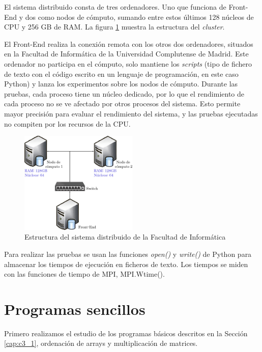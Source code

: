 El sistema distribuido consta de tres ordenadores. Uno que funciona de Front-End y dos como nodos de cómputo, sumando entre estos últimos 128 núcleos de CPU y 256 GB de RAM. La figura \ref{fig:cluster} muestra la estructura del \textit{cluster}.




El Front-End realiza la conexión remota con los otros dos ordenadores, situados en la Facultad de Informática de la Universidad Complutense de Madrid. Este ordenador no participa en el cómputo, solo mantiene los \textit{scripts} (tipo de fichero de texto con el código escrito en un lenguaje de programación, en este caso Python) y lanza los experimentos sobre los nodos de cómputo.  Durante las pruebas, cada proceso tiene un núcleo dedicado, por lo que el rendimiento de cada proceso no se ve afectado por otros procesos del sistema. Esto permite mayor precisión para evaluar el rendimiento del sistema, y las pruebas ejecutadas no compiten por los recursos de la CPU. 


\vspace*{0.2cm}

\begin{figure}[!h]
	\centering
	\includegraphics[width=0.5\textwidth]{images/chapter_4/cluster}
	\caption{Estructura del sistema distribuido de la Facultad de Informática}
	\label{fig:cluster}
\end{figure}


Para realizar las pruebas se usan las funciones \textit{open()} y \textit{write()} de Python para almacenar los tiempos de ejecución en ficheros de texto. Los tiempos se miden con las funciones de
tiempo de MPI, MPI.Wtime().

\section{Programas sencillos}

Primero realizamos el estudio de los programas básicos descritos en la Sección \ref{cap:c3_1}, ordenación de arrays y multiplicación de matrices.

